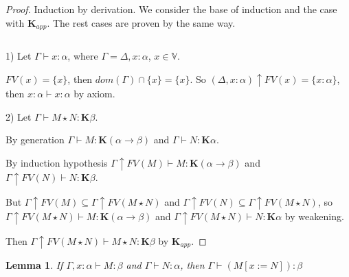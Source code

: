 \documentclass[a4paper]{article}
\newtheorem{lemma}{Lemma}
\begin{document}
  \begin{proof}

  Induction by derivation. We consider the base of induction and the case with $\textbf{K}_{app}$. The rest
  cases are
  proven by the same way.

  $ $

  1) Let $\Gamma \vdash x : \alpha$, where $\Gamma = \Delta, x : \alpha$, $x \in \mathbb{V}$.

  $FV(x) = \{ x\}$, then $dom(\Gamma) \cap \{ x\} = \{ x\}. $ So $(\Delta, x : \alpha) \uparrow FV(x) = \{ x
  : \alpha\}$, then $x : \alpha \vdash x : \alpha$ by axiom.

  2) Let $\Gamma \vdash M \star N : \textbf{K}\beta$.

  By generation $\Gamma \vdash M : \textbf{K}(\alpha \to \beta)$ and $\Gamma \vdash N : \textbf{K}\alpha$.

  By induction hypothesis $\Gamma \uparrow FV(M) \vdash M : \textbf{K}(\alpha \to \beta)$ and $\Gamma
  \uparrow FV(N) \vdash N : \textbf{K}\beta$.

  But $\Gamma \uparrow FV(M) \subseteq \Gamma \uparrow FV(M \star N)$ and $\Gamma
  \uparrow FV(N) \subseteq \Gamma \uparrow FV(M \star N)$, so $\Gamma \uparrow FV(M \star N) \vdash M :
  \textbf{K}(\alpha \to \beta)$ and $\Gamma \uparrow FV(M \star N) \vdash N : \textbf{K}\alpha$ by weakening.

  Then $\Gamma \uparrow FV(M \star N) \vdash M \star N : \textbf{K}\beta$ by $\textbf{K}_{app}$.

  \end{proof}

  \vspace{\baselineskip}

  \begin{lemma}

  If $\Gamma, x : \alpha \vdash M : \beta$  and $\Gamma \vdash N : \alpha$, then $\Gamma \vdash (M [x := N]) :
  \beta $

  \end{lemma}
\end{document}
